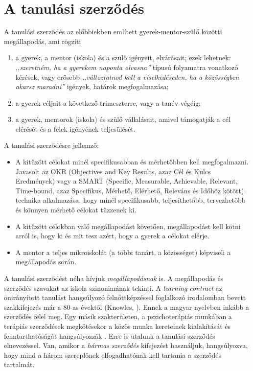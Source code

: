 \section{A tanulási szerződés}

A tanulási szerződés az előbbiekben említett gyerek-mentor-szülő közötti megállapodás, ami rögzíti
\begin{enumerate}
      \item a gyerek, a mentor (iskola) és a szülő igényeit, elvárásait;\hfill\break
 ezek lehetnek: \emph{,,szeretném, ha a gyerekem naponta olvasna''} típusú folyamatra vonatkozó kérések, vagy erősebb \emph{,,változtatnod       kell a viselkedéseden, ha a közösségben akarsz maradni''} igények, határok megfogalmazása;

      \item a gyerek céljait a következő trimeszterre, vagy a tanév végéig;

      \item a gyerek, mentorok (iskola) és szülő vállalásait, amivel támogatják a cél elérését és a felek igényének teljesülését.

\end{enumerate}

A tanulási szerződésre jellemző:
\begin{itemize}
      \item A kitűzött célokat minél specifikusabban és mérhetőbben
        kell megfogalmazni. Javasolt az OKR  (Objectives and Key
        Results, azaz	Cél és Kulcs Eredmények) \citep{okr} vagy
        a\linebreak
        SMART (Specific, Measurable, Achievable, Relevant, Time-bound, azaz Specifikus,  Mérhető, Elérhető, Releváns és Időhöz kötött) \citep{wiki:smart} technika alkalmazása, hogy minél specifikusabb, teljesíthetőbb, tervezhetőbb és könnyen mérhető célokat tűzzenek ki.

      \item A kitűzött célokban való megállapodást követően, megállapodást kell kötni arról is, hogy ki és mit tesz azért, hogy a gyerek a célokat elérje.

      \item A mentor a teljes mikroiskolát (a többi tanárt, a közösséget) képviseli a megállapodás során.
\end{itemize}

A tanulási szerződést néha hívjuk \emph{megállapodásnak} is. A
megállapodás és szerződés szavakat az iskola szinonimának
tekinti. A \emph{learn\-ing con\-tract} az önirányított tanulást
hangsúlyozó felnőttképzéssel foglalkozó irodalomban bevett
szakkifejezés már a 80-as évektől (Knowles,\linebreak
\citeyear{Malcolm77}). Ennek a magyar nyelvben inkább a szerződés felel meg. Egy másik szakterületen, a pszichoterápiás munkában a terápiás szerződések megkötésekor a közös munka kereteinek kialakítását és fenntarthatóságát hangsúlyozzák \citep{pszichoterapia}. Erre is utalunk a tanulási szerződés elnevezéssel. Van, amikor a \emph{hármas szerződés} kifejezést használjuk, hangsúlyozva, hogy mind a három szereplőnek elfogadhatónak kell tartania a szerződés tartalmát.
